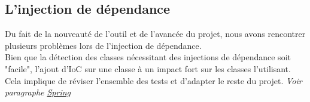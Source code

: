 {}

\subsection{L'injection de dépendance}

Du fait de la nouveauté de l'outil et de l'avancée du projet, nous avons rencontrer plusieurs problèmes lors de l'injection de dépendance.\\
Bien que la détection des classes nécessitant des injections de dépendance soit "facile", l'ajout d'IoC sur une classe à un impact fort sur les classes l'utilisant. Cela implique de réviser l'ensemble des tests et d'adapter le reste du projet. \textit{Voir paragraphe \hyperref[spring]{Spring}}
